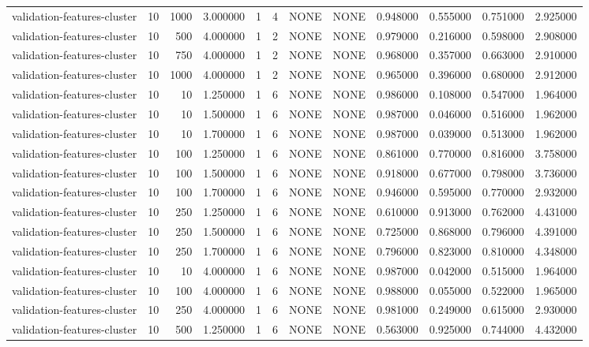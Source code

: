 \begin{tabular}{lrrrllllrrrr}
validation-features-cluster & 10 & 1000 & 3.000000 & 1 & 4 & NONE & NONE & 0.948000 & 0.555000 & 0.751000 & 2.925000 \\
validation-features-cluster & 10 & 500 & 4.000000 & 1 & 2 & NONE & NONE & 0.979000 & 0.216000 & 0.598000 & 2.908000 \\
validation-features-cluster & 10 & 750 & 4.000000 & 1 & 2 & NONE & NONE & 0.968000 & 0.357000 & 0.663000 & 2.910000 \\
validation-features-cluster & 10 & 1000 & 4.000000 & 1 & 2 & NONE & NONE & 0.965000 & 0.396000 & 0.680000 & 2.912000 \\
validation-features-cluster & 10 & 10 & 1.250000 & 1 & 6 & NONE & NONE & 0.986000 & 0.108000 & 0.547000 & 1.964000 \\
validation-features-cluster & 10 & 10 & 1.500000 & 1 & 6 & NONE & NONE & 0.987000 & 0.046000 & 0.516000 & 1.962000 \\
validation-features-cluster & 10 & 10 & 1.700000 & 1 & 6 & NONE & NONE & 0.987000 & 0.039000 & 0.513000 & 1.962000 \\
validation-features-cluster & 10 & 100 & 1.250000 & 1 & 6 & NONE & NONE & 0.861000 & 0.770000 & 0.816000 & 3.758000 \\
validation-features-cluster & 10 & 100 & 1.500000 & 1 & 6 & NONE & NONE & 0.918000 & 0.677000 & 0.798000 & 3.736000 \\
validation-features-cluster & 10 & 100 & 1.700000 & 1 & 6 & NONE & NONE & 0.946000 & 0.595000 & 0.770000 & 2.932000 \\
validation-features-cluster & 10 & 250 & 1.250000 & 1 & 6 & NONE & NONE & 0.610000 & 0.913000 & 0.762000 & 4.431000 \\
validation-features-cluster & 10 & 250 & 1.500000 & 1 & 6 & NONE & NONE & 0.725000 & 0.868000 & 0.796000 & 4.391000 \\
validation-features-cluster & 10 & 250 & 1.700000 & 1 & 6 & NONE & NONE & 0.796000 & 0.823000 & 0.810000 & 4.348000 \\
validation-features-cluster & 10 & 10 & 4.000000 & 1 & 6 & NONE & NONE & 0.987000 & 0.042000 & 0.515000 & 1.964000 \\
validation-features-cluster & 10 & 100 & 4.000000 & 1 & 6 & NONE & NONE & 0.988000 & 0.055000 & 0.522000 & 1.965000 \\
validation-features-cluster & 10 & 250 & 4.000000 & 1 & 6 & NONE & NONE & 0.981000 & 0.249000 & 0.615000 & 2.930000 \\
validation-features-cluster & 10 & 500 & 1.250000 & 1 & 6 & NONE & NONE & 0.563000 & 0.925000 & 0.744000 & 4.432000 \\

\end{tabular}
